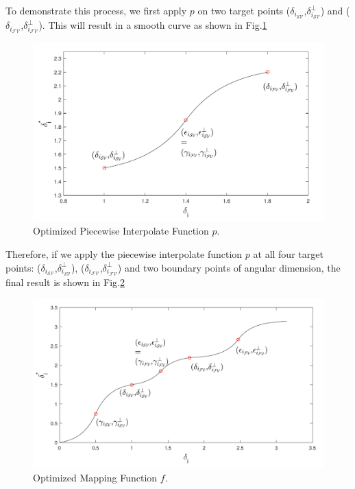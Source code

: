 To demonstrate this process, we first apply $p$ on two target points ($\delta_{i_{{\mathcal{SV}}}}$,$\delta^{\perp}_{i_{{\mathcal{SV}}}}$) and ($\delta_{i_{{\mathcal{FV}}}}$,$\delta^{\perp}_{i_{{\mathcal{FV}}}}$). This will result in a smooth curve as shown in Fig.\ref{fig:optimized_p}

\begin{figure}[t]
\centering
\includegraphics[scale=.7]{Fig/optimized_single_f.pdf}
\caption{Optimized Piecewise Interpolate Function $p$.}
\label{fig:optimized_p}
\end{figure}

Therefore, if we apply the piecewise interpolate function $p$ at all four target points: ($\delta_{i_{{\mathcal{SV}}}}$,$\delta^{\perp}_{i_{{\mathcal{SV}}}}$), ($\delta_{i_{{\mathcal{FV}}}}$,$\delta^{\perp}_{i_{{\mathcal{FV}}}}$) and two boundary points of angular dimension, the final result is shown in Fig.\ref{fig:optimized_map}

\begin{figure}[t]
\centering
\includegraphics[scale=.7]{Fig/optimized_mapping_f.pdf}
\caption{Optimized Mapping Function $f$.}
\label{fig:optimized_map}
\end{figure}

